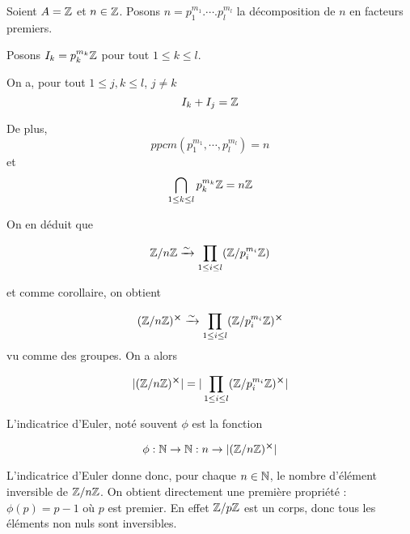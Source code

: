\begin{exemple}
	Soient $A = \mathbb{Z}$ et $n \in \mathbb{Z}$.
	Posons $n = p_{1}^{m_{1}} . \cdots . p_{l}^{m_{l}}$ la décomposition de $n$
	en facteurs premiers.

	Posons $I_{k} = p_{k}^{m_{k}} \mathbb{Z}$ pour tout $1 \leq k \leq l$.

	On a, pour tout $1 \leq j, k \leq l$, $j \neq k$
	\begin{equation}
		I_{k} + I_{j} = \mathbb{Z}
	\end{equation}

	De plus,
	\begin{equation}
		ppcm(p_{1}^{m_{1}}, \cdots, p_{l}^{m_{l}}) = n
	\end{equation}
	et
	\begin{equation}
		\bigcap_{1 \leq k \leq l} p_{k}^{m_{k}} \mathbb{Z} = n \mathbb{Z}
	\end{equation}

	On en déduit que

	\begin{equation}
		\mathbb{Z} / n \mathbb{Z} \xrightarrow{\sim} \prod_{1 \leq i \leq l}
		(\mathbb{Z} / p_{i}^{m_{i}} \mathbb{Z})
	\end{equation}

	et comme corollaire, on obtient

	\begin{equation}
		(\mathbb{Z} / n \mathbb{Z})^{\cross} \xrightarrow{\sim} \prod_{1 \leq i \leq l}
		(\mathbb{Z} / p_{i}^{m_{i}} \mathbb{Z})^{\cross}
	\end{equation}
	vu comme des groupes. On a alors

	\begin{equation}
		|(\mathbb{Z} / n \mathbb{Z})^{\cross}| = |\prod_{1 \leq i \leq l}
		(\mathbb{Z} / p_{i}^{m_{i}} \mathbb{Z})^{\cross}|
	\end{equation}
\end{exemple}

\begin{definition}
	L'indicatrice d'Euler, noté souvent $\phi$ est la fonction

	\begin{equation}
		\phi : \mathbb{N} \rightarrow \mathbb{N} : n \rightarrow
		|(\mathbb{Z}/n\mathbb{Z})^{\cross}|
	\end{equation}
\end{definition}

L'indicatrice d'Euler donne donc, pour chaque $n \in \mathbb{N}$, le nombre
d'élément inversible de $\mathbb{Z}/n\mathbb{Z}$.
On obtient directement une première propriété : $\phi(p) = p - 1$ où $p$ est
premier. En effet $\mathbb{Z}/p\mathbb{Z}$ est un corps, donc tous les éléments non
nuls sont inversibles.

